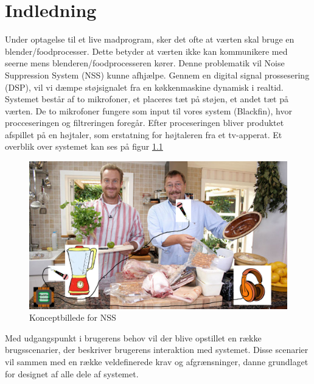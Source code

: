 \graphicspath{{Chapters/Indledning/}}

\chapter{Indledning}

Under optagelse til et live madprogram, sker det ofte at værten skal bruge en blender/foodprocesser. Dette betyder at værten ikke kan kommunikere med seerne mens blenderen/foodprocesseren kører. Denne problematik vil Noise Suppression System (NSS) kunne afhjælpe. Gennem en digital signal prossesering (DSP), vil vi dæmpe støjsignalet fra en køkkenmaskine dynamisk i realtid. Systemet består af to mikrofoner, et placeres tæt på støjen, et andet tæt på værten. De to mikrofoner fungere som input til vores system (Blackfin), hvor procceseringen og filtreringen foregår. Efter proceseringen bliver produktet afspillet på en højtaler, som erstatning for højtaleren fra et tv-apperat. Et overblik over systemet kan ses på figur \ref{fig:konceptbillede}

\begin{figure}[H]
	\centering
	\includegraphics[width = 400pt]{Img/Konceptbillede}
	\caption{Konceptbillede for NSS}
	\label{fig:konceptbillede}
\end{figure}

Med udgangspunkt i brugerens behov vil der blive opstillet en række brugsscenarier, der beskriver brugerens interaktion med systemet. Disse scenarier vil sammen med en række veldefinerede krav og afgrænsninger, danne grundlaget for designet af alle dele af systemet.  \\ 

\newpage

